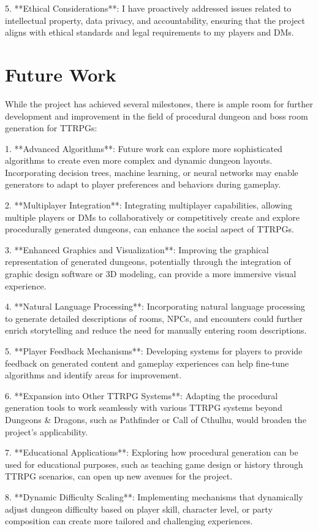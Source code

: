 \documentclass[10pt,twocolumn]{article}
\begin{document}
5. **Ethical Considerations**: I have proactively addressed issues related to intellectual property, data privacy, and accountability, ensuring that the project aligns with ethical standards and legal requirements to my players and DMs.
\section{Future Work}
While the project has achieved several milestones, there is ample room for further development and improvement in the field of procedural dungeon and boss room generation for TTRPGs:

1. **Advanced Algorithms**: Future work can explore more sophisticated algorithms to create even more complex and dynamic dungeon layouts. Incorporating decision trees, machine learning, or neural networks may enable generators to adapt to player preferences and behaviors during gameplay.

2. **Multiplayer Integration**: Integrating multiplayer capabilities, allowing multiple players or DMs to collaboratively or competitively create and explore procedurally generated dungeons, can enhance the social aspect of TTRPGs.

3. **Enhanced Graphics and Visualization**: Improving the graphical representation of generated dungeons, potentially through the integration of graphic design software or 3D modeling, can provide a more immersive visual experience.

4. **Natural Language Processing**: Incorporating natural language processing to generate detailed descriptions of rooms, NPCs, and encounters could further enrich storytelling and reduce the need for manually entering room descriptions.

5. **Player Feedback Mechanisms**: Developing systems for players to provide feedback on generated content and gameplay experiences can help fine-tune algorithms and identify areas for improvement.

6. **Expansion into Other TTRPG Systems**: Adapting the procedural generation tools to work seamlessly with various TTRPG systems beyond Dungeons & Dragons, such as Pathfinder or Call of Cthulhu, would broaden the project's applicability.

7. **Educational Applications**: Exploring how procedural generation can be used for educational purposes, such as teaching game design or history through TTRPG scenarios, can open up new avenues for the project.

8. **Dynamic Difficulty Scaling**: Implementing mechanisms that dynamically adjust dungeon difficulty based on player skill, character level, or party composition can create more tailored and challenging experiences.
\end{document}
